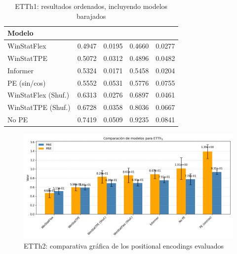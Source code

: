 \begin{table}[ht]
	\centering
	\begin{tabular}{l|N|N|N|N}
		\toprule
		Modelo &  &  &  &  \\
		\midrule
		WinStatFlex            & 0.4947 & 0.0195 & 0.4660 & 0.0277 \\
		WinStatTPE             & 0.5072 & 0.0312 & 0.4896 & 0.0482 \\
		Informer               & 0.5324 & 0.0171 & 0.5458 & 0.0204 \\
		PE (sin/cos)           & 0.5552 & 0.0531 & 0.5776 & 0.0755 \\
		WinStatFlex (Shuf.)    & 0.6313 & 0.0276 & 0.6897 & 0.0461 \\
		WinStatTPE (Shuf.)     & 0.6728 & 0.0358 & 0.8036 & 0.0667 \\
		No PE                  & 0.7419 & 0.0509 & 0.9235 & 0.0841 \\
		\bottomrule
	\end{tabular}
	\caption{ETTh1: resultados ordenados, incluyendo modelos barajados}
	\label{etth1fintab}
\end{table}

\begin{figure}[!ht]
	\centering
	\includegraphics[scale=0.475]{img/etth2fin}
	\caption{ETTh2: comparativa gráfica de los positional encodings evaluados}
	\label{etth2fin}
\end{figure}




